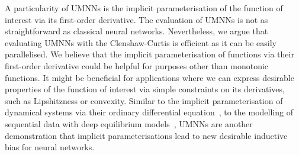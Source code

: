 A particularity of UMNNs is the implicit parameterisation of the function of interest via its first-order derivative. The evaluation of UMNNs is not as straightforward as classical neural networks. Nevertheless, we argue that evaluating UMNNs with the Clenshaw-Curtis is efficient as it can be easily parallelised. We believe that the implicit parameterisation of functions via their first-order derivative could be helpful for purposes other than monotonic functions. It might be beneficial for applications where we can express desirable properties of the function of interest via simple constraints on its derivatives, such as Lipshitzness or convexity. Similar to the implicit parameterisation of dynamical systems via their ordinary differential equation~\citep{chen_neural_2018}, to the modelling of sequential data with deep equilibrium models~\citep{bai2019deep}, UMNNs are another demonstration that implicit parameterisations lead to new desirable inductive bias for neural networks.
